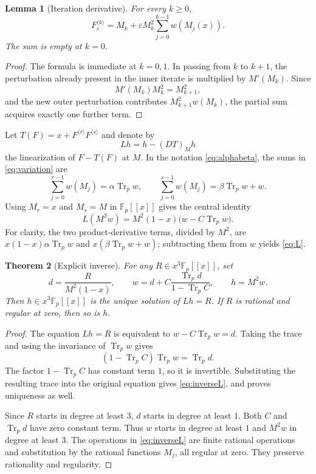 \documentclass[11pt,letterpaper]{article}
\newtheorem{theorem}{Theorem}[section]
\newtheorem{lemma}[theorem]{Lemma}
\theoremstyle{definition}
\theoremstyle{remark}
\newcommand{\F}{\mathbb F}
\newcommand{\iter}[2]{#1^{\langle #2\rangle}}
\DeclareMathOperator{\Tr}{Tr}
\begin{document}
\begin{lemma}[Iteration derivative]\label{lem:variation}
For every $k\geq0$,
\begin{equation}\label{eq:variation}
 \iter{F_\varepsilon}{k}
 =M_k+\varepsilon M_k^2\sum_{j=0}^{k-1}w(M_j(x)).
\end{equation}
The sum is empty at $k=0$.
\end{lemma}
\begin{proof}
The formula is immediate at $k=0,1$.  In passing from $k$ to $k+1$, the
perturbation already present in the inner iterate is multiplied by
$M'(M_k)$.  Since
\[
 M'(M_k)M_k^2=M_{k+1}^2,
\]
and the new outer perturbation contributes
$M_{k+1}^2w(M_k)$, the partial sum acquires exactly one further term.
\end{proof}

Let $T(F)=x+\iter{F}{r}\iter{F}{s}$ and denote by
\[
 Lh=h-(DT)_M h
\]
the linearization of $F-T(F)$ at $M$.  In the notation
\eqref{eq:alphabeta}, the sums in \eqref{eq:variation} are
\[
 \sum_{j=0}^{r-1}w(M_j)=\alpha\Tr_p w,
 \qquad
 \sum_{j=0}^{s-1}w(M_j)=\beta\Tr_p w+w.
\]
Using $M_r=x$ and $M_s=M$ in $\F_p[[x]]$ gives the central identity
\begin{equation}\label{eq:L}
 L(M^2w)=M^2(1-x)\bigl(w-C\Tr_p w\bigr).
\end{equation}
For clarity, the two product-derivative terms, divided by $M^2$, are
$x(1-x)\alpha\Tr_p w$ and $x(\beta\Tr_p w+w)$; subtracting them from
$w$ yields \eqref{eq:L}.

\begin{theorem}[Explicit inverse]\label{thm:inverseL}
For any $R\in x^3\F_p[[x]]$, set
\begin{equation}\label{eq:inverseL}
 d=\frac{R}{M^2(1-x)},\qquad
 w=d+C\frac{\Tr_p d}{1-\Tr_p C},\qquad h=M^2w.
\end{equation}
Then $h\in x^3\F_p[[x]]$ is the unique solution of $Lh=R$.
If $R$ is rational and regular at zero, then so is $h$.
\end{theorem}
\begin{proof}
The equation $Lh=R$ is equivalent to $w-C\Tr_p w=d$.
Taking the trace and using the invariance of $\Tr_p w$ gives
\[
 (1-\Tr_p C)\Tr_p w=\Tr_p d.
\]
The factor $1-\Tr_p C$ has constant term $1$, so it is invertible.
Substituting the resulting trace into the original equation gives
\eqref{eq:inverseL}, and proves uniqueness as well.

Since $R$ starts in degree at least $3$, $d$ starts in degree at least
$1$.  Both $C$ and $\Tr_p d$ have zero constant term.  Thus $w$ starts
in degree at least $1$ and $M^2w$ in degree at least $3$.
The operations in \eqref{eq:inverseL} are finite rational operations
and substitution by the rational functions $M_j$, all regular at zero.
They preserve rationality and regularity.
\end{proof}
\end{document}
